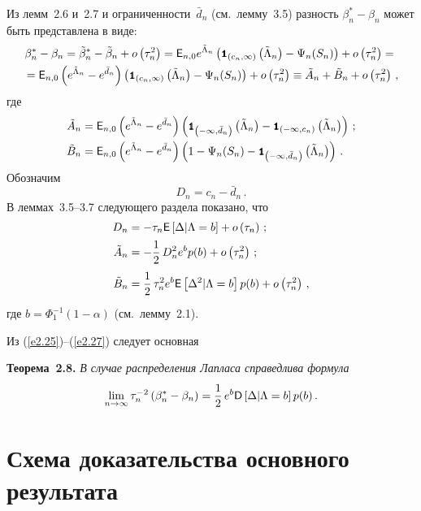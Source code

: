 Из лемм~2.6 и~2.7 и ограниченности~$\bar d_n$ (см.\ лемму~3.5) разность $\beta_n^*-\beta_n$ 
может быть представлена в виде:
\begin{multline*}
\beta_n^*-\beta_n=\tilde\beta_n^*-\tilde\beta_n+ o\left(\tau_n^2\right)
=
{{\sf E}}_{n,0}e^{\tilde\Lambda_n}\left({\mbox{{\small \tt {1}}\hspace{-1.5mm}{\tt 1}}}_{\left(c_n,\infty\right)}\left(\tilde\Lambda_n\right) - \Psi_n(S_n)\right)+ 
o\left(\tau_n^2\right)={}
\\
{}={{\sf E}}_{n,0}\left(e^{\tilde\Lambda_n}-e^{\bar d_n}\right)
\left({\mbox{{\small \tt {1}}\hspace{-1.5mm}{\tt 1}}}_{\left(c_n,\infty\right)}\left(\tilde\Lambda_n\right) - \Psi_n(S_n)\right)+ o\left(\tau_n^2\right)
\equiv \tilde A_n+\tilde B_n+ o\left(\tau_n^2\right)\,,
\end{multline*}
где
\begin{align}
\tilde A_n &=
{{\sf E}}_{n,0}\left(e^{\tilde\Lambda_n}-e^{\bar d_n}\right)
\left({\mbox{{\small \tt {1}}\hspace{-1.5mm}{\tt 1}}}_{\left(-\infty,\bar d_n\right)}\left(\tilde\Lambda_n\right) - {\mbox{{\small \tt {1}}\hspace{-1.5mm}{\tt 1}}}_{(-\infty,c_n)}\left(\tilde\Lambda_n\right)\right)\,;\label{e2.22}\\
\tilde B_n &=
{{\sf E}}_{n,0}\left(e^{\tilde\Lambda_n}-e^{\bar d_n}\right)\left(1 - \Psi_n(S_n) - {\mbox{{\small \tt {1}}\hspace{-1.5mm}{\tt 1}}}_{\left(-\infty,\bar d_n\right)}\left(\tilde\Lambda_n\right)\right)\,.
\label{e2.23}
\end{align}
Обозначим
\begin{equation}
D_n=c_n-\bar d_n\,.
\label{e2.24}
\end{equation}
В леммах~3.5--3.7 следующего раздела показано, что
\begin{align}
D_n &=-\tau_n{{\sf E}}\left[\Delta\vert \Lambda=b \right]+ o\left(\tau_n\right)\,;\label{e2.25}\\
\tilde A_n &=-\displaystyle\frac{\displaystyle 1\mathstrut}{\displaystyle 2\mathstrut}\,D_n^2e^bp(b)+ o\left(\tau_n^2\right)\,; \label{e2.26}\\
\tilde B_n &=\displaystyle\frac{\displaystyle 1\mathstrut}{\displaystyle 2\mathstrut}\,\tau_n^2e^b{{\sf E}}\left[\Delta^2\vert \Lambda=b \right] p(b)+ o\left(\tau_n^2\right)\,,\label{e2.27}
\end{align}
где $b=\Phi_1^{-1}(1-\alpha)$ (см.\ лемму~2.1).

Из (\ref{e2.25})--(\ref{e2.27}) следует основная

\medskip

\noindent
\textbf{Теорема~2.8.} {\it В случае распределения Лапласа справедлива формула
$$
\lim\limits_{n\to\infty}\tau_n^{-2}\left(\beta_n^*-\beta_n\right)=\displaystyle\frac{\displaystyle 1\mathstrut}{\displaystyle 2\mathstrut}\,e^b{{\sf D}}\left[\Delta\vert \Lambda = b\right] p(b)\,.
$$ 
}

\section{Схема доказательства основного результата}

